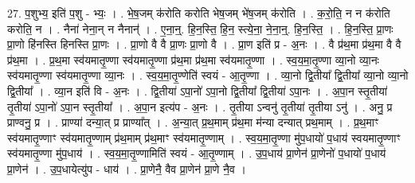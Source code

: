 \documentclass[17pt]{extarticle}
\begin{document}
27. प॒शुभ्य॒ इति॑ प॒शु - भ्यः॒ । . भे॒ष॒जम् क॑रोति करोति भेष॒जम् भे॑ष॒जम् क॑रोति । . क॒रो॒ति॒ न न क॑रोति करोति॒ न । . नैना॑ नेना॒न् न नैनान्॑ । . ए॒ना॒न्॒. हि॒न॒स्ति॒ हि॒न॒ स्त्ये॒ना॒ ने॒ना॒न्॒. हि॒न॒स्ति॒ । . हि॒न॒स्ति॒ प्रा॒णः प्रा॒णो हि॑नस्ति हिनस्ति प्रा॒णः । . प्रा॒णो वै वै प्रा॒णः प्रा॒णो वै । . प्रा॒ण इति॑ प्र - अ॒नः । . वै प्र॑थ॒मा प्र॑थ॒मा वै वै प्र॑थ॒मा । . प्र॒थ॒मा स्व॑यमातृ॒ण्णा स्व॑यमातृ॒ण्णा प्र॑थ॒मा प्र॑थ॒मा स्व॑यमातृ॒ण्णा । . स्व॒य॒मा॒तृ॒ण्णा व्या॒नो व्या॒नः स्व॑यमातृ॒ण्णा स्व॑यमातृ॒ण्णा व्या॒नः । . स्व॒य॒मा॒तृ॒ण्णेति॑ स्वयं - आ॒तृ॒ण्णा । . व्या॒नो द्वि॒तीया᳚ द्वि॒तीया᳚ व्या॒नो व्या॒नो द्वि॒तीया᳚ । . व्या॒न इति॑ वि - अ॒नः । . द्वि॒तीया॑ ऽपा॒नो॑ ऽपा॒नो द्वि॒तीया᳚ द्वि॒तीया॑ ऽपा॒नः । . अ॒पा॒न स्तृ॒तीया॑ तृ॒तीया॑ ऽपा॒नो॑ ऽपा॒न स्तृ॒तीया᳚ । . अ॒पा॒न इत्य॑प - अ॒नः । . तृ॒तीया ऽन्वनु॑ तृ॒तीया॑ तृ॒तीया ऽनु॑ । . अनु॒ प्र प्राण्वनु॒ प्र । . प्राण्या॑ दन्या॒त् प्र प्राण्या᳚त् । . अ॒न्या॒त् प्र॒थ॒माम् प्र॑थ॒मा म॑न्या दन्यात् प्रथ॒माम् । . प्र॒थ॒माꣳ स्व॑यमातृ॒ण्णाꣳ स्व॑यमातृ॒ण्णाम् प्र॑थ॒माम् प्र॑थ॒माꣳ स्व॑यमातृ॒ण्णाम् । . स्व॒य॒मा॒तृ॒ण्णा मु॑प॒धायो॑ प॒धाय॑ स्वयमातृ॒ण्णाꣳ स्व॑यमातृ॒ण्णा मु॑प॒धाय॑ । . स्व॒य॒मा॒तृ॒ण्णामिति॑ स्वयं - आ॒तृ॒ण्णाम् । . उ॒प॒धाय॑ प्रा॒णेन॑ प्रा॒णेनो॑ प॒धायो॑ प॒धाय॑ प्रा॒णेन॑ । . उ॒प॒धायेत्यु॑प - धाय॑ । . प्रा॒णेनै॒ वैव प्रा॒णेन॑ प्रा॒णे नै॒व । \newline
\end{document}

